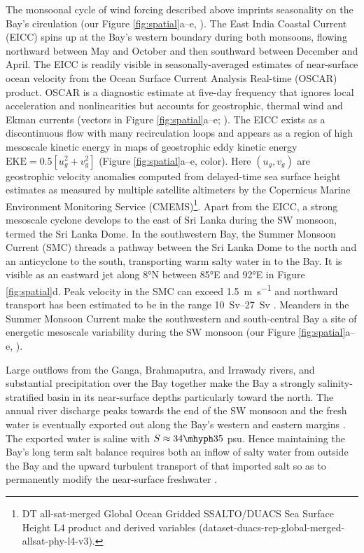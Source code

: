 \documentclass[twocol]{ametsoc}
\begin{document}
The monsoonal cycle of wind forcing described above imprints seasonality on the Bay's circulation (our Figure \ref{fig:spatial}a--e, \citealp{Schott2002,Shankar2002}).
The East India Coastal Current (EICC) spins up at the Bay's western boundary during both monsoons, flowing northward between May and October and then southward between December and April.
The EICC is readily visible in seasonally-averaged estimates of near-surface ocean velocity from the Ocean Surface Current Analysis Real-time (OSCAR) product.
OSCAR is a diagnostic estimate at five-day frequency that ignores local acceleration and nonlinearities but accounts for geostrophic, thermal wind and Ekman currents (vectors in Figure \ref{fig:spatial}a--e; \citealp{Bonjean2002}).
The EICC exists as a discontinuous flow with many recirculation loops \citep{Durand2009} and appears as a region of high mesoscale kinetic energy in maps of geostrophic eddy kinetic energy \(\text{EKE} = 0.5[u_g^2 + v_g^2]\) (Figure \ref{fig:spatial}a--e, color).
Here \((u_g, v_g)\) are geostrophic velocity anomalies computed from delayed-time sea surface height estimates as measured by multiple satellite altimeters by the Copernicus Marine Environment Monitoring Service (CMEMS)\footnote{DT all-sat-merged Global Ocean Gridded SSALTO/DUACS Sea Surface Height L4 product and derived variables (dataset-duacs-rep-global-merged-allsat-phy-l4-v3).}.
Apart from the EICC, a strong mesoscale cyclone develops to the east of Sri Lanka during the SW monsoon, termed the Sri Lanka Dome.
In the southwestern Bay, the Summer Monsoon Current (SMC) threads a pathway between the Sri Lanka Dome to the north and an anticyclone to the south, transporting warm salty water in to the Bay.
It is visible as an eastward jet along 8°N between 85°E and 92°E in Figure \ref{fig:spatial}d.
Peak velocity in the SMC can exceed \SI{1.5}{\meter\per\second} and northward transport has been estimated to be in the range \SIrange{10}{27}{Sv} \citep{Wijesekera2016,Vinayachandran1999,Webber2018}.
Meanders in the Summer Monsoon Current make the southwestern and south-central Bay a site of energetic mesoscale variability during the SW monsoon (our Figure \ref{fig:spatial}a--e, \citealp{Vinayachandran1998,Chen2018}).

Large outflows from the Ganga, Brahmaputra, and Irrawady rivers, and substantial precipitation over the Bay together make the Bay a strongly salinity-stratified basin in its near-surface depths particularly toward the north.
The annual river discharge peaks towards the end of the SW monsoon and the fresh water is eventually exported out along the Bay's western and eastern margins \citep{Sengupta2006}.
The exported water is saline with \(S \approx 34 \mhyph 35\) \si{psu}.
Hence maintaining the Bay's long term salt balance requires both an inflow of salty water from outside the Bay and the upward turbulent transport of that imported salt so as to permanently modify the near-surface freshwater \citep{Vinayachandran2013}.
\end{document}
